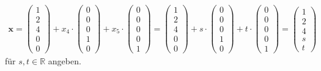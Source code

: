 \begin{align*}
\textbf{x}
= \begin{pmatrix}
1\\ 
2\\
4\\
0\\
0
\end{pmatrix}
+
x_4 \cdot
\begin{pmatrix}
0\\
0\\
0\\
1\\
0
\end{pmatrix}
+
x_5 \cdot
\begin{pmatrix}
0\\
0\\
0\\
0\\
1
\end{pmatrix}
= \begin{pmatrix}
1\\ 
2\\
4\\
0\\
0
\end{pmatrix}
+
s \cdot
\begin{pmatrix}
0\\
0\\
0\\
1\\
0
\end{pmatrix}
+
t \cdot
\begin{pmatrix}
0\\
0\\
0\\
0\\
1
\end{pmatrix}
=
\begin{pmatrix}
1\\ 
2\\
4\\
s\\
t
\end{pmatrix}
\end{align*}
für $s,t \in \mathbb{R}$ angeben.

